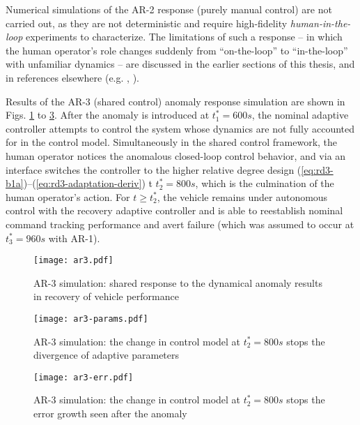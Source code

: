 Numerical simulations of the AR-2 response (purely manual control) are not carried out, as they are not deterministic and require high-fidelity \textit{human-in-the-loop} experiments to characterize. The limitations of such a response -- in which the human operator's role changes suddenly from ``on-the-loop'' to ``in-the-loop'' with unfamiliar dynamics -- are discussed in the earlier sections of this thesis, and in references elsewhere (e.g. \cite{endsley1996automation}, \cite{hess2015modeling}).

Results of the AR-3 (shared control) anomaly response simulation are shown in Figs. \ref{fig:ar3-sim} to \ref{fig:ar3-err}. After the anomaly is introduced at $t_1^* = 600 s$, the nominal adaptive controller attempts to control the system whose dynamics are not fully accounted for in the control model. Simultaneously in the shared control framework, the human operator notices the anomalous closed-loop control behavior, and via an interface switches the controller to the higher relative degree design (\ref{eq:rd3-b1a})--(\ref{eq:rd3-adaptation-deriv}) t $t_2^* = 800 s$, which is the culmination of the human operator's action. For $t \geq t_2^*$, the vehicle remains under autonomous control with the recovery adaptive controller and is able to reestablish nominal command tracking performance and avert failure (which was assumed to occur at $t_3^* = 960 s$ with AR-1).

\begin{figure}[htbp]
	\centering
	\texttt{[image: ar3.pdf]}
	\caption{AR-3 simulation: shared response to the dynamical anomaly results in recovery of vehicle performance}
	\label{fig:ar3-sim}
\end{figure}

\begin{figure}[htbp]
	\centering
	\texttt{[image: ar3-params.pdf]}
	\caption{AR-3 simulation: the change in control model at $t_2^* = 800 s$ stops the divergence of adaptive parameters}
	\label{fig:ar3-params}
\end{figure}

\begin{figure}[htbp]
	\centering
	\texttt{[image: ar3-err.pdf]}
	\caption{AR-3 simulation: the change in control model at $t_2^* = 800 s$ stops the error growth seen after the anomaly}
	\label{fig:ar3-err}
\end{figure}
